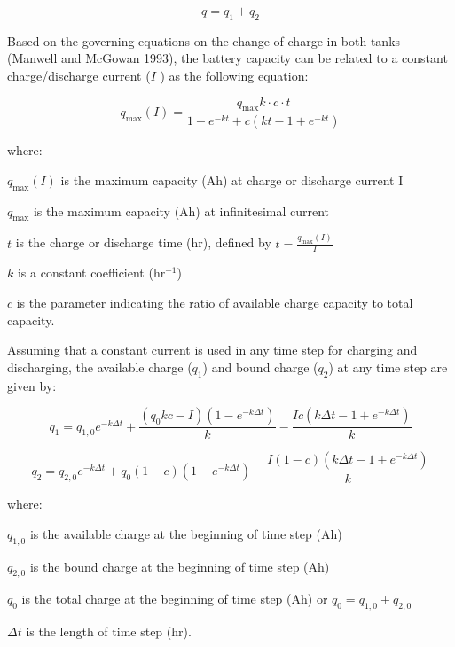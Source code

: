 \begin{equation}
q = {q_1} + {q_2}
\end{equation}

Based on the governing equations on the change of charge in both tanks (Manwell and McGowan 1993), the battery capacity can be related to a constant charge/discharge current (\(I\) ) as the following equation:

\begin{equation}
{q_{\max }}(I) = \frac{{{q_{\max }}k \cdot c \cdot t}}{{1 - {e^{ - kt}} + c(kt - 1 + {e^{ - kt}})}}
\end{equation}

where:

\({q_{\max }}(I)\) is the maximum capacity (Ah) at charge or discharge current I

\({q_{\max }}\) is the maximum capacity (Ah) at infinitesimal current

\(t\) is the charge or discharge time (hr), defined by \(t = \frac{{{q_{\max }}(I)}}{I}\)

\(k\) is a constant coefficient (hr\(^{-1}\))

\(c\) is the parameter indicating the ratio of available charge capacity to total capacity.

Assuming that a constant current is used in any time step for charging and discharging, the available charge (\({q_1}\)) and bound charge (\({q_2}\)) at any time step are given by:

\begin{equation}
{q_1} = {q_{1,0}}{e^{ - k\Delta t}} + \frac{{({q_0}kc - I)(1 - {e^{ - k\Delta t}})}}{k} - \frac{{Ic(k\Delta t - 1 + {e^{ - k\Delta t}})}}{k}
\end{equation}

\begin{equation}
{q_2} = {q_{2,0}}{e^{ - k\Delta t}} + {q_0}(1 - c)(1 - {e^{ - k\Delta t}}) - \frac{{I(1 - c)(k\Delta t - 1 + {e^{ - k\Delta t}})}}{k}
\end{equation}

where:

\({q_{1,0}}\) is the available charge at the beginning of time step (Ah)

\({q_{2,0}}\) is the bound charge at the beginning of time step (Ah)

\({q_0}\) is the total charge at the beginning of time step (Ah) or \({q_0} = {q_{1,0}} + {q_{2,0}}\)

\(\Delta t\) is the length of time step (hr).

